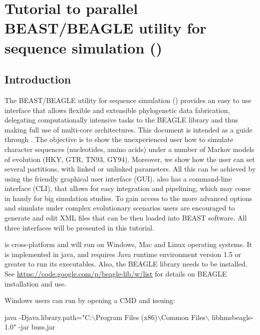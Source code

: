 \chapter{Tutorial to parallel BEAST/BEAGLE utility for sequence simulation ({\bussname})\label{app:pibuss_tuto}}

\section{Introduction} 

The BEAST/BEAGLE utility for sequence simulation ({\bussname}) provides an easy to use interface that allows flexible and extensible phylogenetic data fabrication, delegating computationally intensive tasks to the BEAGLE library and thus making full use of multi-core architectures.
This document is intended as a guide through {\bussname}. The objective is to show the unexperienced user how to simulate character sequences (nucleotides, amino acids)  under a number of Markov models of evolution (HKY, GTR, TN93, GY94). Moreover, we show  how the user can set several partitions, with linked or unlinked parameters. All this can be achieved by using the friendly graphical user interface (GUI). {\bussname} also has a command-line interface (CLI), that allows for easy integration and pipelining, which may come in handy for big simulation studies. 
To gain access to the more advanced options and simulate under complex evolutionary scenarios users are encouraged to generate and edit XML files that can be then loaded into BEAST software.
All three interfaces will be presented in this tutorial.

{\bussname} is cross-platform and will run on Windows, Mac and Linux operating systems. It is implemented in java, and requires Java runtime environment version 1.5 or greater to run its executables. Also, the BEAGLE library needs to be installed. See \url{https://code.google.com/p/beagle-lib/w/list} for details on BEAGLE installation and use.

Windows users can run {\bussname} by opening a CMD and issuing:
 
\begin{code}
java -Djava.library.path="C:$\backslash$Program Files (x86)$\backslash$Common Files$\backslash$ libhmsbeagle-1.0" -jar buss.jar
\end{code}
 
